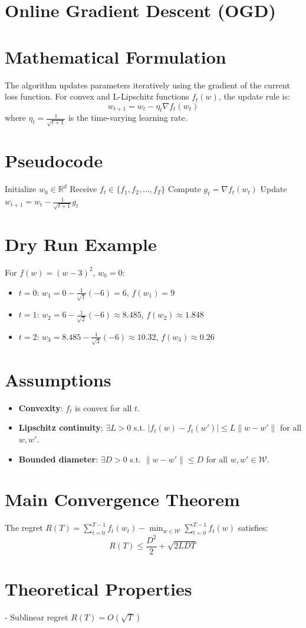 \documentclass{article}
\begin{document}
\section*{Online Gradient Descent (OGD)}
\section*{Mathematical Formulation}
The algorithm updates parameters iteratively using the gradient of the current loss function. For convex and L-Lipschitz functions \( f_t(w) \), the update rule is:
\[ w_{t+1} = w_t - \eta_t \nabla f_t(w_t) \]
where \( \eta_t = \frac{1}{\sqrt{t+1}} \) is the time-varying learning rate.

\section*{Pseudocode}
\begin{algorithm}[H]
  \caption{Online Gradient Descent (OGD)}
  \begin{algorithmic}[1]
    \State Initialize \( w_0 \in \mathbb{R}^d \)
      \State Receive \( f_t \in \{ f_1, f_2, \ldots, f_T \} \)
      \State Compute \( g_t = \nabla f_t(w_t) \)
      \State Update \( w_{t+1} = w_t - \frac{1}{\sqrt{t+1}} g_t \)
    \EndFor
  \end{algorithmic}
\end{algorithm}

\section*{Dry Run Example}
For \( f(w) = (w-3)^2 \), \( w_0 = 0 \):
\begin{itemize}
  \item \( t=0 \): \( w_1 = 0 - \frac{1}{\sqrt{1}}(-6) = 6 \), \( f(w_1) = 9 \)
  \item \( t=1 \): \( w_2 = 6 - \frac{1}{\sqrt{2}}(-6) \approx 8.485 \), \( f(w_2) \approx 1.848 \)
  \item \( t=2 \): \( w_3 = 8.485 - \frac{1}{\sqrt{3}}(-6) \approx 10.32 \), \( f(w_3) \approx 0.26 \)
\end{itemize}

\section*{Assumptions}
\begin{itemize}
  \item \textbf{Convexity}: \( f_t \) is convex for all \( t \).
  \item \textbf{Lipschitz continuity}: \( \exists L > 0 \) s.t. \( |f_t(w) - f_t(w')| \leq L\|w - w'\| \) for all \( w, w' \).
  \item \textbf{Bounded diameter}: \( \exists D > 0 \) s.t. \( \| w - w' \| \leq D \) for all \( w, w' \in \mathcal{W} \).
\end{itemize}

\section*{Main Convergence Theorem}
The regret \( R(T) = \sum_{t=0}^{T-1} f_t(w_t) - \min_{w \in \mathcal{W}} \sum_{t=0}^{T-1} f_t(w) \) satisfies:
\[ R(T) \leq \frac{D^2}{2} + \sqrt{2LDT} \]

\section*{Theoretical Properties}
- Sublinear regret \( R(T) = O(\sqrt{T}) \)
\end{document}
